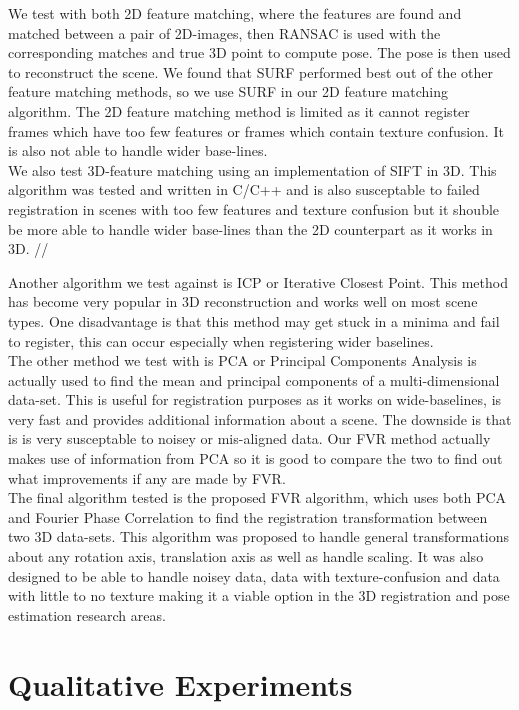 We test with both 2D feature matching, where the features are found and matched between a pair of 2D-images, then RANSAC is used with the corresponding matches and true 3D point to compute pose. The pose is then used to reconstruct the scene. We found that SURF performed best out of the other feature matching methods, so we use SURF in our 2D feature matching algorithm. The 2D feature matching method is limited as it cannot register frames which have too few features or frames which contain texture confusion. It is also not able to handle wider base-lines. \\

We also test 3D-feature matching using an implementation of SIFT in 3D. This algorithm was tested and written in C/C++ and is also susceptable to failed registration in scenes with too few features and texture confusion but it shouble be more able to handle wider base-lines than the 2D counterpart as it works in 3D. //

Another algorithm we test against is ICP or Iterative Closest Point. This method has become very popular in 3D reconstruction and works well on most scene types. One disadvantage is that this method may get stuck in a minima and fail to register, this can occur especially when registering wider baselines. \\

The other method we test with is PCA or Principal Components Analysis is actually used to find the mean and principal components of a multi-dimensional data-set. This is useful for registration purposes as it works on wide-baselines, is very fast and provides additional information about a scene. The downside is that is is very susceptable to noisey or mis-aligned data. Our FVR method actually makes use of information from PCA so it is good to compare the two to find out what improvements if any are made by FVR. \\

The final algorithm tested is the proposed FVR algorithm, which uses both PCA and Fourier Phase Correlation to find the registration transformation between two 3D data-sets. This algorithm was proposed to handle general transformations about any rotation axis, translation axis as well as handle scaling. It was also designed to be able to handle noisey data, data with texture-confusion and data with little to no texture making it a viable option in the 3D registration and pose estimation research areas.


\section{Qualitative Experiments}



